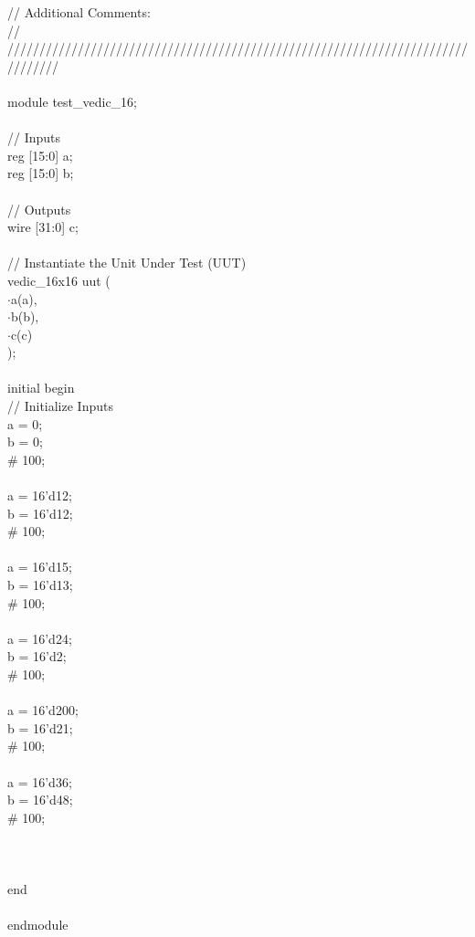 // Additional Comments:\\
// \\
////////////////////////////////////////////////////////////////////////////////\\
\\
module test\_vedic\_16;\\
\\
	// Inputs\\
	reg [15:0] a;\\
	reg [15:0] b;\\
\\
	// Outputs\\
	wire [31:0] c;\\
\\
	// Instantiate the Unit Under Test (UUT)\\
	vedic\_16x16 uut (\\
		$ \cdot $a(a), \\
		$ \cdot $b(b), \\
		$ \cdot $c(c)\\
	);\\
\\
	initial begin\\
		// Initialize Inputs\\
		a = 0;\\
		b = 0;\\
		\# 100;\\
		\\
		a = 16'd12;\\
		b = 16'd12;\\
		\# 100;\\
		\\
		a = 16'd15;\\
		b = 16'd13;\\
		\# 100;\\
		\\
		a = 16'd24;\\
		b = 16'd2;\\
		\# 100;\\
		\\
		a = 16'd200;\\
		b = 16'd21;\\
		\# 100;\\
		\\
		a = 16'd36;\\
		b = 16'd48;\\
		\# 100;\\
        \\
		\\
\\
	end\\
      \\
endmodule\\
\\





